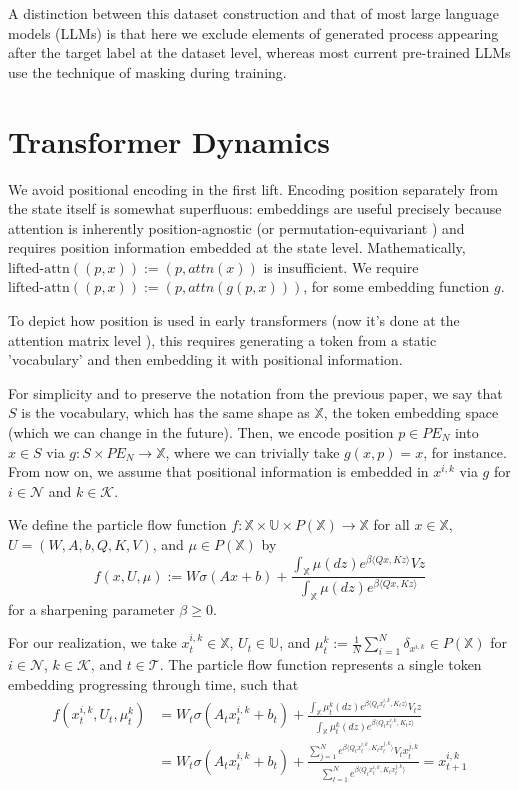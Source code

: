 \documentclass{article}
\begin{document}
A distinction between this dataset construction and that of most large language models (LLMs) is that here we exclude elements of generated process appearing after the target label at the dataset level, whereas most current pre-trained LLMs use the technique of masking \cite{devlin2019bertpretrainingdeepbidirectional} during training. \cite{zhao2024analysing}

\section{Transformer Dynamics}
We avoid positional encoding in the first lift. Encoding position separately from the state itself is somewhat superfluous: embeddings are useful precisely because attention is inherently position-agnostic (or permutation-equivariant \cite{geshkovski2025mathematical}) and requires position information embedded at the state level. Mathematically, $\text{lifted-attn}((p, x)) := (p, attn(x))$ is insufficient. We require $\text{lifted-attn}((p, x)) := (p, attn(g(p, x)))$, for some embedding function $g$.

To depict how position is used in early transformers (now it's done at the attention matrix level \cite{barbero2024round}), this requires generating a token from a static 'vocabulary' and then embedding it with positional information. 

For simplicity and to preserve the notation from the previous paper, we say that $S$ is the vocabulary, which has the same shape as $\mathbb{X}$, the token embedding space (which we can change in the future). Then, we encode position $p \in PE_N$ into $x \in S$ via $g:S\times PE_N \to \mathbb{X}$, where we can trivially take $g(x, p) = x$, for instance. From now on, we assume that positional information is embedded in $x^{i,k}$ via $g$ for $i \in \mathcal N$ and $k \in \mathcal K$. 

We define the particle flow function $f: \mathbb X \times \mathbb U \times P(\mathbb X) \to \mathbb X$ for all $x \in \mathbb X$, $U = (W, A, b, Q, K, V)$, and $\mu \in P(\mathbb X)$ by 
$$
f(x, U, \mu) := W \sigma(Ax + b) + \frac{\int _ \mathbb{X} \mu(dz)e^{\beta \langle Qx, Kz \rangle} Vz}{\int _ \mathbb{X} \mu(dz)e^{\beta \langle Qx, Kz \rangle} }
$$
for a sharpening parameter $\beta \geq 0$. 

For our realization, we take $x ^{i, k}_t \in \mathbb X$, $U_t \in \mathbb U$, and $\mu _t ^k := \frac{1}{N} \sum_{i=1}^N \delta _{x^{i, k}} \in P(\mathbb X)$ for $i \in \mathcal N$, $k \in \mathcal K$, and $t \in \mathcal T$. The particle flow function represents a single token embedding progressing through time, such that
\begin{align*}
f(x ^{i, k}_t, U_t, \mu _t ^k) &= W_t \sigma(A_t x ^{i, k}_t + b_t) + \frac{\int _\mathbb X \mu _t ^k(dz)e^{\beta \langle Q_t x ^{i, k}_t, K_t z \rangle} V_t z}{\int _ \mathbb X \mu _t ^k(dz)e^{\beta \langle Q_t x ^{i, k}_t, K_t z \rangle} }\\
&=W_t \sigma(A_t x ^{i, k}_t + b_t) + \frac{\sum _{j = 1}^N e^{\beta \langle Q_t x ^{i, k}_t, K_t x^{j, k}_t \rangle } V_t x^{j, k}_t}{\sum _{l = 1}^{N} e^{\beta \langle Q_t x ^{i, k}_t, K_t x^{j, k}_t \rangle }} = x^{i, k}_{t + 1}
\end{align*}
\end{document}
